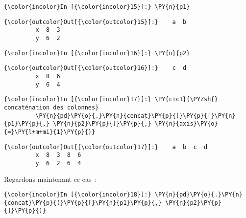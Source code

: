     \begin{Verbatim}[commandchars=\\\{\},frame=single,framerule=0.3mm,rulecolor=\color{cellframecolor}]
{\color{incolor}In [{\color{incolor}15}]:} \PY{n}{p1}
\end{Verbatim}


\begin{Verbatim}[commandchars=\\\{\},frame=single,framerule=0.3mm,rulecolor=\color{cellframecolor}]
{\color{outcolor}Out[{\color{outcolor}15}]:}    a  b
         x  8  3
         y  6  2
\end{Verbatim}
            
    \begin{Verbatim}[commandchars=\\\{\},frame=single,framerule=0.3mm,rulecolor=\color{cellframecolor}]
{\color{incolor}In [{\color{incolor}16}]:} \PY{n}{p2}
\end{Verbatim}


\begin{Verbatim}[commandchars=\\\{\},frame=single,framerule=0.3mm,rulecolor=\color{cellframecolor}]
{\color{outcolor}Out[{\color{outcolor}16}]:}    c  d
         x  8  6
         y  6  4
\end{Verbatim}
            
    \begin{Verbatim}[commandchars=\\\{\},frame=single,framerule=0.3mm,rulecolor=\color{cellframecolor}]
{\color{incolor}In [{\color{incolor}17}]:} \PY{c+c1}{\PYZsh{} concaténation des colonnes}
         \PY{n}{pd}\PY{o}{.}\PY{n}{concat}\PY{p}{(}\PY{p}{[}\PY{n}{p1}\PY{p}{,} \PY{n}{p2}\PY{p}{]}\PY{p}{,} \PY{n}{axis}\PY{o}{=}\PY{l+m+mi}{1}\PY{p}{)}
\end{Verbatim}


\begin{Verbatim}[commandchars=\\\{\},frame=single,framerule=0.3mm,rulecolor=\color{cellframecolor}]
{\color{outcolor}Out[{\color{outcolor}17}]:}    a  b  c  d
         x  8  3  8  6
         y  6  2  6  4
\end{Verbatim}
            
    Regardons maintenant ce cas~:

    \begin{Verbatim}[commandchars=\\\{\},frame=single,framerule=0.3mm,rulecolor=\color{cellframecolor}]
{\color{incolor}In [{\color{incolor}18}]:} \PY{n}{pd}\PY{o}{.}\PY{n}{concat}\PY{p}{(}\PY{p}{[}\PY{n}{p1}\PY{p}{,} \PY{n}{p2}\PY{p}{]}\PY{p}{)}
\end{Verbatim}


